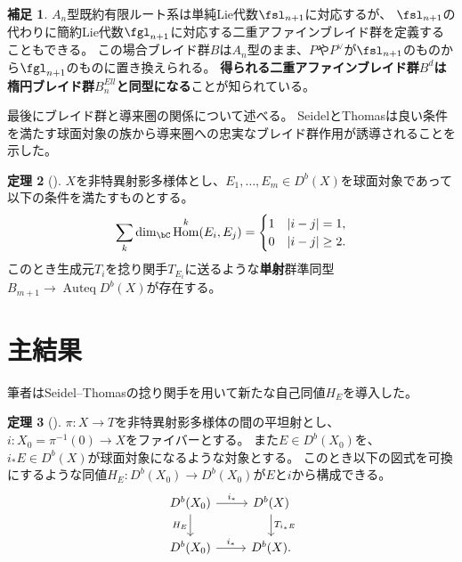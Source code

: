 \documentclass[uplatex,11pt,a4paper,dvipdfmx]{jsarticle}
\numberwithin{equation}{section}
\numberwithin{figure}{section}
\theoremstyle{definition}
\newtheorem{theorem}{定理}[section]
\newtheorem{remark}[theorem]{補足}
\DeclareMathOperator{\Hom}{\mathrm{Hom}}
\DeclareMathOperator{\Auteq}{\mathrm{Auteq}}
\begin{document}
\begin{remark}\label{remark:gl-braid-group}
    $A_n$型既約有限ルート系は単純Lie代数$\fsl_{n+1}$に対応するが、
    $\fsl_{n+1}$の代わりに簡約Lie代数$\fgl_{n+1}$に対応する二重アファインブレイド群を定義することもできる。
    この場合ブレイド群$B$は$A_n$型のまま、$P$や$P^\vee$が$\fsl_{n+1}$のものから$\fgl_{n+1}$のものに置き換えられる。
    \textbf{得られる二重アファインブレイド群$B^d$は楕円ブレイド群$B^{Ell}_n$と同型になる}ことが知られている。
\end{remark}


最後にブレイド群と導来圏の関係について述べる。
SeidelとThomasは良い条件を満たす球面対象の族から導来圏への忠実なブレイド群作用が誘導されることを示した\cite{MR1831820}。
\begin{theorem}[\cite{MR1831820}]
    $X$を非特異射影多様体とし、$E_1, \dots, E_m \in D^b(X)$を球面対象であって以下の条件を満たすものとする。
    \begin{equation}
        \sum_k\dim_\bC\Hom^k(E_i, E_j) = \begin{cases}
            1 & |i-j| = 1,    \\
            0 & |i-j| \geq 2.
        \end{cases}
    \end{equation}
    このとき生成元$T_i$を捻り関手$T_{E_i}$に送るような\textbf{単射}群準同型$B_{m+1} \to \Auteq D^b(X)$が存在する。
\end{theorem}




\section{主結果}
筆者はSeidel--Thomasの捻り関手を用いて新たな自己同値$H_E$を導入した。
\begin{theorem}[\cite{2023arXiv230212501A}]
    $\pi \colon X \to T$を非特異射影多様体の間の平坦射とし、$i \colon X_0 = \pi^{-1}(0) \to X$をファイバーとする。
    また$E \in D^b(X_0)$を、$i_*E \in D^b(X)$が球面対象になるような対象とする。
    このとき以下の図式を可換にするような同値$H_E \colon D^b(X_0) \to D^b(X_0)$が$E$と$i$から構成できる。
    \begin{equation}
        \begin{tikzcd}
            D^b(X_0) \arrow[r,"i_*"]\arrow[d, "H_E"'] & D^b(X) \arrow[d,"T_{i_*E}"]\\
            D^b(X_0) \arrow[r, "i_*"]& D^b(X).
        \end{tikzcd}
    \end{equation}
\end{theorem}
\end{document}
